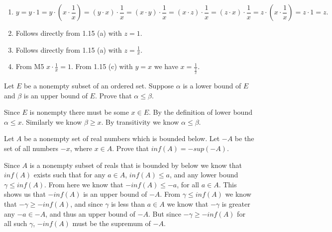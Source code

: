 \begin{solution}
  \begin{enumerate}[label=(\alph*)]
    \item \[y = y \cdot 1 = y \cdot (x \cdot \frac{1}{x}) = (y \cdot x) \cdot \frac{1}{x} = (x \cdot y) \cdot \frac{1}{x} = (x \cdot z) \cdot \frac{1}{x} = (z \cdot x) \cdot \frac{1}{x} = z \cdot (x \cdot \frac{1}{x}) = z \cdot 1 = z.\]
    \item Follows directly from 1.15 (a) with $z = 1$.
    \item Follows directly from 1.15 (a) with $z = \frac{1}{x}$.
    \item From M5 $x \cdot \frac{1}{x} = 1$. From 1.15 (c) with $y = x$ we have $x = \frac{1}{\frac{1}{x}}$.
  \end{enumerate}
\end{solution}

\begin{problem}
  Let $E$ be a nonempty subset of an ordered set.
  Suppose $\alpha$ is a lower bound of $E$ and $\beta$ is an upper bound of $E$.
  Prove that $\alpha \le \beta$.
\end{problem}

\begin{solution}
  Since $E$ is nonempty there must be some $x \in E$.
  By the definition of lower bound $\alpha \le x$. Similarly we know $\beta \ge x$.
  By transitivity we know $\alpha \le \beta$.
\end{solution}

\begin{problem}
  Let $A$ be a nonempty set of real numbers which is bounded below.
  Let $-A$ be the set of all numbers $-x$, where $x \in A$.
  Prove that $inf(A) = -sup(-A)$.
\end{problem}

\begin{solution}
  Since $A$ is a nonempty subset of reals that is bounded by below we know that $inf(A)$ exists such that for any $a \in A$, $inf(A) \le a$, and any lower bound $\gamma \le inf(A)$.
  From here we know that $-inf(A) \le -a$, for all $a \in A$.
  This shows us that $-inf(A)$ is an upper bound of $-A$.
  From $\gamma \le inf(A)$ we know that $-\gamma \ge -inf(A)$, and since $\gamma$ is less than $a \in A$ we know that $-\gamma$ is greater any $-a \in -A$, and thus an upper bound of $-A$.
  But since $-\gamma \ge -inf(A)$ for all such $\gamma$, $-inf(A)$ must be the supremum of $-A$.
\end{solution}

